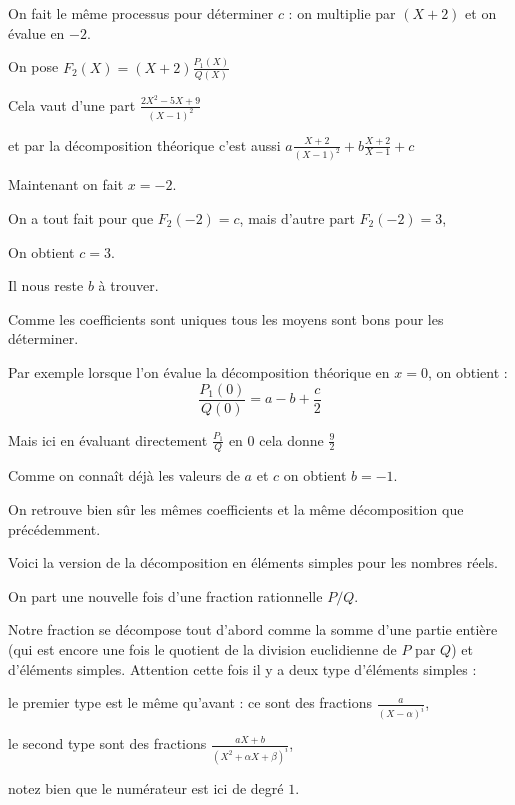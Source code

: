 On fait le même processus pour déterminer $c$ : on 
multiplie par $(X+2)$ et on évalue en $-2$.

On pose $F_2(X) = (X+2)\frac{P_1(X)}{Q(X)}$

\change

Cela vaut d'une part $\frac{2X^2-5X+9}{(X-1)^2}$ 

\change

et par la décomposition théorique c'est aussi
$a\frac{X+2}{(X-1)^2} + b\frac{X+2}{X-1} + c$ 

Maintenant on fait $x=-2$.

On a tout fait pour que $F_2(-2) = c$, mais d'autre part $F_2(-2) = 3$, 

On obtient $c=3$.

Il nous reste $b$ à trouver.

Comme les coefficients sont uniques tous les moyens sont bons pour les déterminer.

\change


Par exemple lorsque l'on évalue la décomposition théorique 
en $x=0$, on obtient :
$$\frac{P_1(0)}{Q(0)} = a - b + \frac c2$$

Mais ici en évaluant directement $\frac{P_1}{Q}$ en $0$ cela donne $\frac{9}{2}$

Comme on connaît déjà les valeurs de $a$ et $c$ on obtient $b=-1$.

\change

On retrouve bien sûr les mêmes coefficients et la même décomposition que précédemment.


\diapo

Voici la version de la décomposition en éléments simples pour les nombres réels.

On part une nouvelle fois d'une fraction rationnelle $P/Q$.

Notre fraction se décompose tout d'abord comme la somme
d'une partie entière (qui est encore une fois le quotient de la division euclidienne de $P$ par $Q$)
et d'éléments simples. 
Attention cette fois il y a deux type d'éléments simples :

le premier type est le même qu'avant : ce sont des fractions $\frac{a}{(X-\alpha)^i}$,

le second type sont des fractions $\frac{aX+b}{(X^2+\alpha X + \beta)^i}$,

notez bien que le numérateur est ici de degré $1$.

\change


